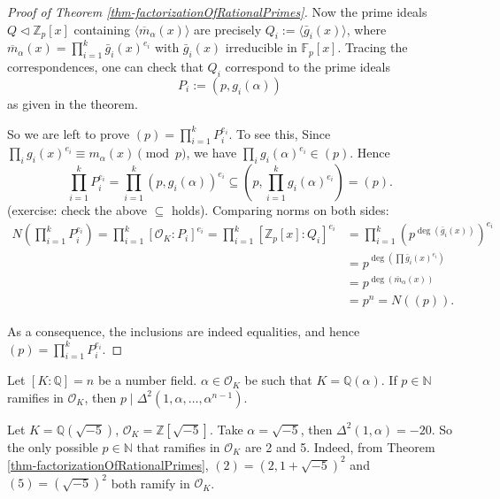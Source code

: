 \begin{proof}[Proof of Theorem \ref{thm-factorizationOfRationalPrimes}]
Now the prime ideals $Q\lhd\mathbb{Z}_p[x]$ containing $\langle\overline{m}_{\alpha}(x)\rangle$ are precisely $Q_i:=\langle\bar g_i(x)\rangle$, where $\overline{m}_{\alpha}(x)=\prod_{i=1}^k\bar g_i(x)^{e_i}$ with $\bar g_i(x)$ irreducible in $\mathbb F_p[x]$. Tracing the correspondences, one can check that $Q_i$ correspond to the prime ideals
$$P_i := (p, g_i(\alpha))$$ 
as given in the theorem.

So we are left to prove $(p) = \prod_{i=1}^k P_i^{e_i}$. To see this,
Since $\prod_i g_i(x)^{e_i}\equiv m_\alpha(x)\pmod p$, we have $\prod_i g_i(\alpha)^{e_i}\in(p)$. Hence
$$
\prod_{i=1}^k P_i^{e_i}=\prod_{i=1}^k (p,g_i(\alpha))^{e_i}
\subseteq \left(p,\prod_{i=1}^k g_i(\alpha)^{e_i}\right)=(p).
$$
(exercise: check the above $\subseteq$ holds). Comparing norms on both sides:
\begin{align*}
N\left(\prod_{i=1}^k P_i^{e_i}\right) = \prod_{i=1}^k [\mathcal{O}_K: P_i]^{e_i} 
= \prod_{i=1}^k [\mathbb{Z}_p[x]: Q_i]^{e_i} &= \prod_{i=1}^k (p^{\deg(\bar{g}_i(x))})^{e_i}\\ &= p^{\deg(\prod \bar{g}_i(x)^{e_i})}\\ &= p^{\deg(\bar{m}_{\alpha}(x))}\\ &= p^n = N((p)).    
\end{align*}

As a consequence, the inclusions are indeed equalities, and hence $(p) = \prod_{i=1}^k P_i^{e_i}$.
\end{proof}

\begin{corollary}\label{cor-ramifiedPrimeNorm}
    Let $[K:\mathbb{Q}]=n$ be a number field. $\alpha\in \mathcal{O}_{K}$ be such that $K=\mathbb{Q}(\alpha)$. If $p\in\mathbb{N}$ ramifies in $\mathcal{O}_{K}$, then $p\mid \Delta^{2}(1,\alpha,\dots,\alpha^{n-1})$. 
\end{corollary}

\begin{example}
    Let $K=\mathbb{Q}(\sqrt{-5})$, $\mathcal{O}_{K}=\mathbb{Z}[\sqrt{-5}]$. Take $\alpha=\sqrt{-5}$, then $\Delta^{2}(1,\alpha)=-20$. So the only possible $p\in \mathbb{N}$ that ramifies in $\mathcal{O}_{K}$ are 2 and 5. Indeed, from Theorem \ref{thm-factorizationOfRationalPrimes}, $(2)=(2,1+\sqrt{-5})^{2}$ and $(5)=(\sqrt{-5})^{2}$ both ramify in $\mathcal{O}_K$. 
\end{example}

